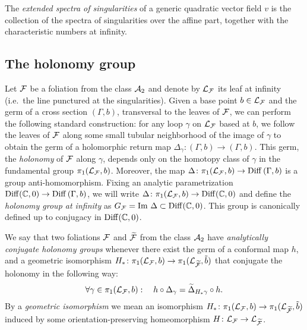 \documentclass[phd,tocprelim]{cornell}
\begin{document}
\begin{definition}\label{def:extendedSpectra}
 The \textit{extended spectra of singularities} of a generic quadratic vector field $v$ is the collection of the spectra of singularities over the affine part, together with the characteristic numbers at infinity.
\end{definition}


\subsection{The holonomy group}

Let $\mathcal{F}$ be a foliation from the class $\mathcal{A}_2$ and denote by $\mathcal{L}_{\mathcal{F}}$ its leaf at infinity (i.e.~the line punctured at the singularities). Given a base point $b\in\mathcal{L}_{\mathcal{F}}$ and the germ of a cross section $(\Gamma,b)$, transversal to the leaves of $\mathcal{F}$, we can perform the following standard construction: for any loop $\gamma$ on $\mathcal{L}_{\mathcal{F}}$ based at $b$, we follow the leaves of $\mathcal{F}$ along some small tubular neighborhood of the image of $\gamma$ to obtain the germ of a holomorphic return map $\Delta_\gamma\colon (\Gamma,b)\to(\Gamma,b)$. This germ, the \textit{holonomy} of $\mathcal{F}$ along $\gamma$, depends only on the homotopy class of $\gamma$ in the fundamental group $\pi_1(\mathcal{L}_{\mathcal{F}},b)$. Moreover, the map $\Delta\colon\pi_1(\mathcal{L}_{\mathcal{F}},b)\to \operatorname{Diff}\,(\Gamma,b)$ is a group anti-homomorphism. Fixing an analytic parametrization $\operatorname{Diff}(\mathbb{C},0)\to \operatorname{Diff}\,(\Gamma,b)$, we will write $\Delta\colon\pi_1(\mathcal{L}_{\mathcal{F}},b)\to\operatorname{Diff}(\mathbb{C},0)$ and define the \textit{holonomy group at infinity} as $G_{\mathcal{F}}=\operatorname{Im}\,\Delta\subset\operatorname{Diff}(\mathbb{C},0)$. This group is canonically defined up to conjugacy in $\operatorname{Diff}(\mathbb{C},0)$.

\begin{definition}\label{def:conjugateholonomy}
 We say that two foliations $\mathcal{F}$ and $\widetilde{\mathcal{F}}$ from the class $\mathcal{A}_2$ have \textit{analytically conjugate holonomy groups} whenever there exist the germ of a conformal map $h$, and a geometric isomorphism $H_{\ast}\colon \pi_1(\mathcal{L}_{\mathcal{F}},b)\to\pi_1(\mathcal{L}_{\widetilde{\mathcal{F}}},\tilde{b})$ that conjugate the holonomy in the following way:
  \[ \forall\gamma\in\pi_1(\LF,b): \quad %
     h\circ\Delta_\gamma = \widetilde{\Delta}_{H_{\ast}\gamma}\circ h. \]
By a \textit{geometric isomorphism} we mean an isomorphism $H_{\ast}\colon \pi_1(\mathcal{L}_{\mathcal{F}},b)\to\pi_1(\mathcal{L}_{\widetilde{\mathcal{F}}},\tilde{b})$ induced by some orientation-preserving homeomorphism $H\colon\mathcal{L}_{\mathcal{F}}\to\mathcal{L}_{\widetilde{\mathcal{F}}}$.
\end{definition}
\end{document}
